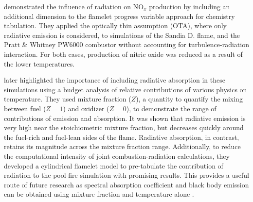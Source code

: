 \citet{Ihme2008ModelingFormulation} demonstrated the influence of radiation on NO$_x$ production by including an additional dimension to the flamelet progress variable approach for chemistry tabulation.
They applied the optically thin assumption (OTA), where only radiative emission is considered, to simulations of the Sandia D. flame, and the Pratt \& Whitney PW6000 combustor without accounting for turbulence-radiation interaction.
For both cases, production of nitric oxide was reduced as a result of the lower temperatures.

\citet{Wu2021LimitationsFires} later highlighted the importance of including radiative absorption in these simulations using a budget analysis of relative contributions of various physics on temperature. 
They used mixture fraction ($Z$), a quantity to quantify the mixing between fuel ($Z=1$) and oxidizer ($Z=0$), to demonstrate the range of contributions of emission and absorption.
It was shown that radiative emission is very high near the stoichiometric mixture fraction, but decreases quickly around the fuel-rich and fuel-lean sides of the flame. Radiative absorption, in contrast, retains its magnitude across the mixture fraction range.
Additionally, to reduce the computational intensity of joint combustion-radiation calculations, they developed a cylindrical flamelet model to pre-tabulate the contribution of radiation to the pool-fire simulation with promising results.
This provides a useful route of future research as spectral absorption coefficient and black body emission can be obtained using mixture fraction and temperature alone \cite{Viskanta2010RadiativeSystems}.


